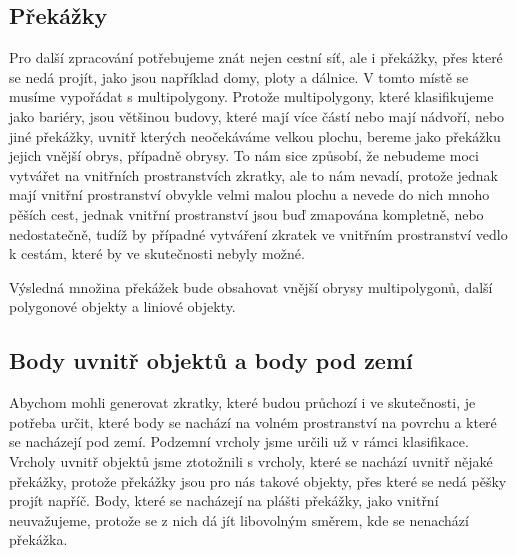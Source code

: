 \subsection{Překážky}
Pro další zpracování potřebujeme znát nejen cestní síť, ale i překážky, přes
které se nedá projít, jako jsou například domy, ploty a dálnice. V tomto místě
se musíme vypořádat s multipolygony. Protože multipolygony, které klasifikujeme
jako bariéry, jsou většinou budovy, které mají více částí nebo mají nádvoří,
nebo jiné překážky, uvnitř kterých neočekáváme velkou plochu, bereme
jako překážku jejich vnější obrys, případně obrysy. To nám sice způsobí, že
nebudeme moci vytvářet na vnitřních prostranstvích zkratky, ale to nám nevadí,
protože jednak mají vnitřní prostranství obvykle velmi malou plochu a nevede do
nich mnoho pěších cest, jednak vnitřní prostranství jsou buď zmapována
kompletně, nebo nedostatečně, tudíž by případné vytváření zkratek ve vnitřním
prostranství vedlo k cestám, které by ve skutečnosti nebyly možné.

Výsledná množina překážek bude obsahovat vnější obrysy multipolygonů, další
polygonové objekty a liniové objekty.

\subsection{Body uvnitř objektů a body pod zemí}
Abychom mohli generovat zkratky, které budou průchozí i ve skutečnosti, je
potřeba určit, které body se nachází na volném prostranství na povrchu a které
se nacházejí pod zemí. Podzemní vrcholy jsme určili už v rámci klasifikace.
Vrcholy uvnitř objektů jsme ztotožnili s vrcholy, které se nachází uvnitř nějaké
překážky, protože překážky jsou pro nás takové objekty, přes které se nedá pěšky
projít napříč. Body, které se nacházejí na plášti překážky, jako vnitřní
neuvažujeme, protože se z nich dá jít libovolným směrem, kde se nenachází
překážka.

